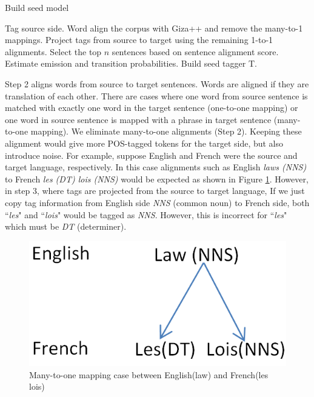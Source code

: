 \begin{algorithm}
\caption{Build seed model}
\label{alg:seedmodel}
\begin{algorithmic} [1]
\STATE Tag source side.
\STATE Word align the corpus with Giza++ and remove the many-to-1 mappings.
\STATE Project tags from source to target using the remaining 1-to-1 alignments.
\STATE Select the top $n$ sentences based on sentence alignment score.
\STATE Estimate emission and transition probabilities. 
\STATE Build seed tagger T. 
\end{algorithmic}
\end{algorithm}

Step 2 aligns words from source to target sentences. Words are aligned if they are translation of each other. There are cases where one word from source sentence is matched with exactly one word in the target sentence (one-to-one mapping) or one word in source sentence is mapped with a phrase in target sentence (many-to-one mapping). We eliminate many-to-one alignments (Step 2). Keeping these alignment would give
more POS-tagged tokens for the target side, but also introduce
noise. For example, suppose English and French were the source and
target language, respectively. In this case alignments such as English
\emph{laws (NNS)} to French \emph{les (DT) lois (NNS)} would be
expected \cite{YarowskyAndNgai} as shown in Figure \ref{fig:sampleEn_Fr}. However, in step 3, where tags are projected from the source to target language, If we just copy tag information from English side \textit{NNS} (common noun) to French side, both ``\textit{les}" and ``\textit{lois}" would be tagged as \textit{NNS}. However, this is incorrect for ``\textit{les}" which must be \textit{DT} (determiner). 

 \begin{figure}
 \centering
 \includegraphics[scale=0.4]{Figures/En_Fr_sample.png}
 \caption{Many-to-one mapping case between English(law) and French(les lois)}
 \label{fig:sampleEn_Fr}
 \end{figure}


